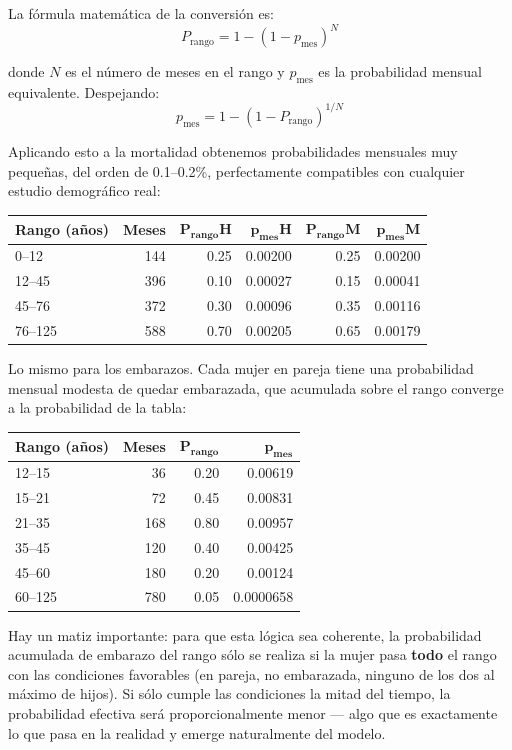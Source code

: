 \documentclass[12pt,a4paper]{article}
\begin{document}
La fórmula matemática de la conversión es:
\[
P_{\text{rango}} = 1 - (1 - p_{\text{mes}})^N
\]

donde $N$ es el número de meses en el rango y $p_{\text{mes}}$ es la probabilidad mensual equivalente. Despejando:
\[
p_{\text{mes}} = 1 - (1 - P_{\text{rango}})^{1/N}
\]

Aplicando esto a la mortalidad obtenemos probabilidades mensuales muy pequeñas, del orden de 0.1--0.2\%, perfectamente compatibles con cualquier estudio demográfico real:

\begin{center}
\begin{tabular}{lrrrrr}
\toprule
\textbf{Rango (años)} & \textbf{Meses} & $\boldsymbol{P_{\text{rango}}}$\textbf{H} & $\boldsymbol{p_{\text{mes}}}$\textbf{H} & $\boldsymbol{P_{\text{rango}}}$\textbf{M} & $\boldsymbol{p_{\text{mes}}}$\textbf{M} \\
\midrule
0--12   & 144 & 0.25 & 0.00200 & 0.25 & 0.00200 \\
12--45  & 396 & 0.10 & 0.00027 & 0.15 & 0.00041 \\
45--76  & 372 & 0.30 & 0.00096 & 0.35 & 0.00116 \\
76--125 & 588 & 0.70 & 0.00205 & 0.65 & 0.00179 \\
\bottomrule
\end{tabular}
\end{center}

Lo mismo para los embarazos. Cada mujer en pareja tiene una probabilidad mensual modesta de quedar embarazada, que acumulada sobre el rango converge a la probabilidad de la tabla:

\begin{center}
\begin{tabular}{lrrr}
\toprule
\textbf{Rango (años)} & \textbf{Meses} & $\boldsymbol{P_{\text{rango}}}$ & $\boldsymbol{p_{\text{mes}}}$ \\
\midrule
12--15  &  36 & 0.20 & 0.00619   \\
15--21  &  72 & 0.45 & 0.00831   \\
21--35  & 168 & 0.80 & 0.00957   \\
35--45  & 120 & 0.40 & 0.00425   \\
45--60  & 180 & 0.20 & 0.00124   \\
60--125 & 780 & 0.05 & 0.0000658 \\
\bottomrule
\end{tabular}
\end{center}

Hay un matiz importante: para que esta lógica sea coherente, la probabilidad acumulada de embarazo del rango sólo se realiza si la mujer pasa \textbf{todo} el rango con las condiciones favorables (en pareja, no embarazada, ninguno de los dos al máximo de hijos). Si sólo cumple las condiciones la mitad del tiempo, la probabilidad efectiva será proporcionalmente menor --- algo que es exactamente lo que pasa en la realidad y emerge naturalmente del modelo.
\end{document}
